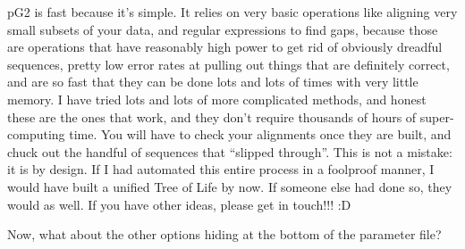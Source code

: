 \documentclass[12pt]{article}
\begin{document}
pG2 is fast because it's simple. It relies on very basic operations
like aligning very small subsets of your data, and regular expressions
to find gaps, because those are operations that have reasonably high
power to get rid of obviously dreadful sequences, pretty low error
rates at pulling out things that are definitely correct, and are so
fast that they can be done lots and lots of times with very little
memory. I have tried lots and lots of more complicated methods, and
honest these are the ones that work, and they don't require thousands
of hours of super-computing time. You will have to check your
alignments once they are built, and chuck out the handful of sequences
that ``slipped through''. This is not a mistake: it is by design. If I
had automated this entire process in a foolproof manner, I would have
built a unified Tree of Life by now. If someone else had done so, they
would as well. If you have other ideas, please get in touch!!! :D

Now, what about the other options hiding at the bottom of the
parameter file?
\end{document}
